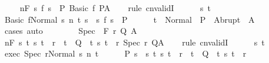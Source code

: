 \begin{isabellebody}
\ \ \isamarkupfalse%
\ {\isachardoublequoteopen}{\isasymGamma}{\isacharcomma}{\isasymTheta}\ {\isasymTurnstile}n{\isacharcolon}\isactrlbsub {\isacharslash}F\isactrlesub \ {\isacharbraceleft}s{\isachardot}\ f\ s\ {\isasymin}\ P{\isacharbraceright}\ {\isacharparenleft}Basic\ f{\isacharparenright}\ P{\isacharcomma}A{\isachardoublequoteclose}\isanewline
\ \ \isamarkupfalse%
\ {\isacharparenleft}rule\ cnvalidI{\isacharparenright}\isanewline
\ \ \ \ \isamarkupfalse%
\ s\ t\isanewline
\ \ \ \ \isamarkupfalse%
\ {\isachardoublequoteopen}{\isasymGamma}{\isasymturnstile}{\isasymlangle}Basic\ f{\isacharcomma}Normal\ s{\isasymrangle}\ {\isacharequal}n{\isasymRightarrow}\ t{\isachardoublequoteclose}\ {\isachardoublequoteopen}s\ {\isasymin}\ {\isacharbraceleft}s{\isachardot}\ f\ s\ {\isasymin}\ P{\isacharbraceright}{\isachardoublequoteclose}\isanewline
\ \ \ \ \isamarkupfalse%
\ {\isachardoublequoteopen}t\ {\isasymin}\ Normal\ {\isacharbackquote}\ P\ {\isasymunion}\ Abrupt\ {\isacharbackquote}\ A{\isachardoublequoteclose}\isanewline
\ \ \ \ \ \ \isamarkupfalse%
\ cases\ auto\isanewline
\ \ \isamarkupfalse%
\isanewline
{}\isamarkupfalse%
\ \isanewline
\ \ \isamarkupfalse%
\ {\isacharparenleft}Spec\ {\isasymTheta}\ F\ r\ Q\ A{\isacharparenright}\isanewline
\ \ \isamarkupfalse%
\ {\isachardoublequoteopen}{\isasymGamma}{\isacharcomma}{\isasymTheta}{\isasymTurnstile}n{\isacharcolon}\isactrlbsub {\isacharslash}F\isactrlesub \ {\isacharbraceleft}s{\isachardot}\ {\isacharparenleft}{\isasymforall}t{\isachardot}\ {\isacharparenleft}s{\isacharcomma}\ t{\isacharparenright}\ {\isasymin}\ r\ {\isasymlongrightarrow}\ t\ {\isasymin}\ Q{\isacharparenright}\ {\isasymand}\ {\isacharparenleft}{\isasymexists}t{\isachardot}\ {\isacharparenleft}s{\isacharcomma}\ t{\isacharparenright}\ {\isasymin}\ r{\isacharparenright}{\isacharbraceright}\ Spec\ r\ Q{\isacharcomma}A{\isachardoublequoteclose}\isanewline
\ \ \isamarkupfalse%
\ {\isacharparenleft}rule\ cnvalidI{\isacharparenright}\isanewline
\ \ \ \ \isamarkupfalse%
\ s\ t\isanewline
\ \ \ \ \isamarkupfalse%
\ exec{\isacharcolon}\ {\isachardoublequoteopen}{\isasymGamma}{\isasymturnstile}{\isasymlangle}Spec\ r{\isacharcomma}Normal\ s{\isasymrangle}\ {\isacharequal}n{\isasymRightarrow}\ t{\isachardoublequoteclose}\isanewline
\ \ \ \ \isamarkupfalse%
\ P{\isacharcolon}\ {\isachardoublequoteopen}s\ {\isasymin}\ {\isacharbraceleft}s{\isachardot}\ {\isacharparenleft}{\isasymforall}t{\isachardot}\ {\isacharparenleft}s{\isacharcomma}\ t{\isacharparenright}\ {\isasymin}\ r\ {\isasymlongrightarrow}\ t\ {\isasymin}\ Q{\isacharparenright}\ {\isasymand}\ {\isacharparenleft}{\isasymexists}t{\isachardot}\ {\isacharparenleft}s{\isacharcomma}\ t{\isacharparenright}\ {\isasymin}\ r{\isacharparenright}{\isacharbraceright}{\isachardoublequoteclose}\isanewline

\end{isabellebody}
